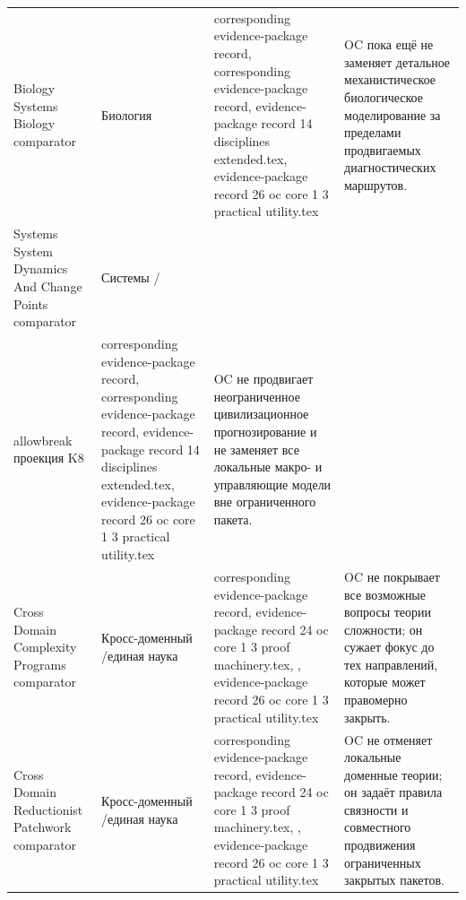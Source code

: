\begin{longtable}{@{}L{0.20\textwidth}L{0.11\textwidth}L{0.33\textwidth}L{0.28\textwidth}@{}}
Biology Systems Biology comparator & Биология & corresponding evidence-package record, corresponding evidence-package record, \allowbreak evidence-package record 14 disciplines extended.tex, \allowbreak evidence-package record 26 oc core 1 3 practical utility.tex & OC пока ещё не заменяет детальное механистическое биологическое моделирование за пределами продвигаемых диагностических маршрутов. \\
Systems System Dynamics And Change Points comparator & Системы /\\allowbreak проекция K8 & corresponding evidence-package record, corresponding evidence-package record, \allowbreak evidence-package record 14 disciplines extended.tex, \allowbreak evidence-package record 26 oc core 1 3 practical utility.tex & OC не продвигает неограниченное цивилизационное прогнозирование и не заменяет все локальные макро- и управляющие модели вне ограниченного пакета. \\
Cross Domain Complexity Programs comparator & Кросс-доменный /\allowbreak единая наука & corresponding evidence-package record, \allowbreak evidence-package record 24 oc core 1 3 proof machinery.tex, \allowbreak {}, \allowbreak evidence-package record 26 oc core 1 3 practical utility.tex & OC не покрывает все возможные вопросы теории сложности; он сужает фокус до тех направлений, которые может правомерно закрыть. \\
Cross Domain Reductionist Patchwork comparator & Кросс-доменный /\allowbreak единая наука & corresponding evidence-package record, \allowbreak evidence-package record 24 oc core 1 3 proof machinery.tex, \allowbreak {}, \allowbreak evidence-package record 26 oc core 1 3 practical utility.tex & OC не отменяет локальные доменные теории; он задаёт правила связности и совместного продвижения ограниченных закрытых пакетов. \\
\bottomrule
\end{longtable}

